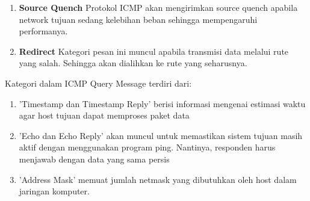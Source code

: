 \documentclass{article}
\begin{document}
\begin{flushleft}
\begin{enumerate}
            \item \textbf{Source Quench}
            \newline
            Protokol ICMP akan mengirimkan source quench apabila network tujuan sedang kelebihan beban sehingga mempengaruhi performanya.

            \item \textbf{Redirect}
            \newline
            Kategori pesan ini muncul apabila transmisi data melalui rute yang salah. Sehingga akan dialihkan ke rute yang seharusnya.
        \end{enumerate}

        Kategori dalam ICMP Query Message terdiri dari:

        \begin{enumerate}
            \item 'Timestamp dan Timestamp Reply' berisi informasi mengenai estimasi waktu agar host tujuan dapat memproses paket data
            \item  'Echo dan Echo Reply' akan muncul untuk memastikan sistem tujuan masih aktif dengan menggunakan program ping. Nantinya, responden harus menjawab dengan data yang sama persis
            \item 'Address Mask' memuat jumlah netmask yang dibutuhkan oleh host dalam jaringan komputer.
        \end{enumerate}
    \end{flushleft}
\end{document}
